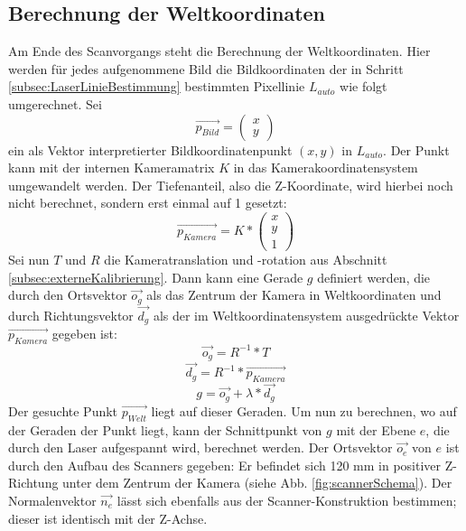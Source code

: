 \subsection{Berechnung der Weltkoordinaten}
\label{subsec:weltkoordinaten}
Am Ende des Scanvorgangs steht die Berechnung der Weltkoordinaten. Hier werden für jedes aufgenommene Bild die Bildkoordinaten der in Schritt \ref{subsec:LaserLinieBestimmung} bestimmten Pixellinie \(L_{auto}\) wie folgt umgerechnet. Sei 
\begin{equation}
\vec{p_{Bild}} = \left(\begin{array}{c}x\\y\end{array}\right)
\end{equation} 
ein als Vektor interpretierter Bildkoordinatenpunkt \((x, y)\) in \(L_{auto}\). Der Punkt kann mit der internen Kameramatrix \(K\) in das Kamerakoordinatensystem umgewandelt werden. Der Tiefenanteil, also die Z-Koordinate, wird hierbei noch nicht berechnet, sondern erst einmal auf 1 gesetzt:
\begin{equation}
\vec{p_{Kamera}}  = K * \left(\begin{array}{c}x\\y\\1\end{array}\right)
\end{equation}
Sei nun \(T\) und \(R\) die Kameratranslation und -rotation aus Abschnitt \ref{subsec:externeKalibrierung}. Dann kann eine Gerade \(g\) definiert werden, die durch den Ortsvektor \(\vec{o_{g}}\) als das Zentrum der Kamera in Weltkoordinaten und durch Richtungsvektor \(\vec{d_{g}}\) als der im Weltkoordinatensystem ausgedrückte Vektor \(\vec{p_{Kamera}}\) gegeben ist:
\begin{equation}
\vec{o_{g}} = R^{-1} * T
\end{equation}
\begin{equation}
\vec{d_{g}} = R^{-1} * \vec{p_{Kamera}}
\end{equation}
\begin{equation}
g = \vec{o_{g}} + \lambda * \vec{d_{g}}
\end{equation}
Der gesuchte Punkt \(\vec{p_{Welt}}\) liegt auf dieser Geraden. Um nun zu berechnen, wo auf der Geraden der Punkt liegt, kann der Schnittpunkt von \(g\) mit der Ebene \(e\), die durch den Laser aufgespannt wird, berechnet werden. Der Ortsvektor \(\vec{o_{e}}\) von \(e\) ist durch den Aufbau des Scanners gegeben: Er befindet sich 120 mm in positiver Z-Richtung unter dem Zentrum der Kamera (siehe Abb. \ref{fig:scannerSchema}). Der Normalenvektor \(\vec{n_{e}}\) lässt sich ebenfalls aus der Scanner-Konstruktion bestimmen; dieser ist identisch mit der Z-Achse.
